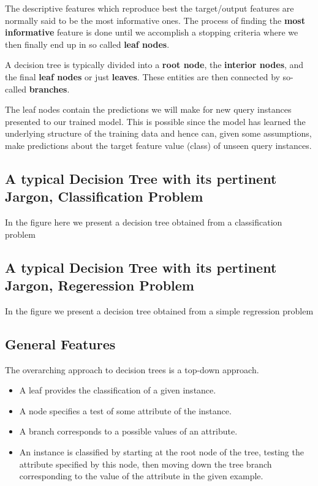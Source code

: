 \documentclass[%
oneside,                 %
final,                   %
10pt]{article}
\begin{document}
The descriptive features which reproduce best the target/output features are normally  said
to be the most informative ones. The process of finding the \textbf{most
informative} feature is done until we accomplish a stopping criteria
where we then finally end up in so called \textbf{leaf nodes}. 

A decision tree is typically divided into a \textbf{root node}, the \textbf{interior nodes},
and the final \textbf{leaf nodes} or just \textbf{leaves}. These entities are then connected by so-called \textbf{branches}.

The leaf nodes
contain the predictions we will make for new query instances presented
to our trained model. This is possible since the model has 
learned the underlying structure of the training data and hence can,
given some assumptions, make predictions about the target feature value
(class) of unseen query instances.

\subsection*{A typical Decision Tree with its pertinent Jargon, Classification Problem}

In the figure here we present a decision tree obtained from a classification problem


\subsection*{A typical Decision Tree with its pertinent Jargon, Regeression Problem}

In the figure we present a decision tree obtained from a simple regression  problem


\subsection*{General Features}

The overarching approach to decision trees is a top-down approach.

\begin{itemize}
\item A leaf provides the classification of a given instance.

\item A node specifies a test of some attribute of the instance.

\item A branch corresponds to a possible values of an attribute.

\item An instance is classified by starting at the root node of the tree, testing the attribute specified by this node, then moving down the tree branch corresponding to the value of the attribute in the given example.
\end{itemize}
\end{document}
